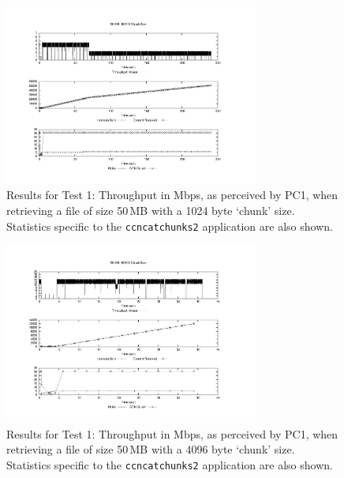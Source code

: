 \begin{figure}[H]

    \centering
    \includegraphics[width=0.75\textwidth]{figures/udp_50_1024.pdf}
    \cprotect\caption{Results for Test 1: Throughput in Mbps, as perceived by 
        PC1, when retrieving a file of size 50\,MB with a 1024 byte 
        `chunk' size. Statistics specific to the \verb+ccncatchunks2+ application 
        are also shown.}
    \label{fig:test-1-thpt-50-1024}

\end{figure}

\begin{figure}[H]

    \centering
    \includegraphics[width=0.75\textwidth]{figures/udp_50_4096.pdf}
    \cprotect\caption{Results for Test 1: Throughput in Mbps, as perceived by 
        PC1, when retrieving a file of size 50\,MB with a 4096 byte 
        `chunk' size. Statistics specific to the \verb+ccncatchunks2+ application 
        are also shown.}
    \label{fig:test-1-thpt-50-4096}

\end{figure}

